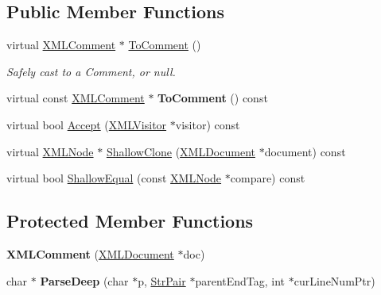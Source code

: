 \subsection*{Public Member Functions}
\begin{DoxyCompactItemize}
\item 
virtual \hyperlink{classtinyxml2_1_1XMLComment}{X\+M\+L\+Comment} $\ast$ \hyperlink{classtinyxml2_1_1XMLComment_a8093e1dc8a34fa446d9dc3fde0e6c0ee}{To\+Comment} ()\hypertarget{classtinyxml2_1_1XMLComment_a8093e1dc8a34fa446d9dc3fde0e6c0ee}{}\label{classtinyxml2_1_1XMLComment_a8093e1dc8a34fa446d9dc3fde0e6c0ee}

\begin{DoxyCompactList}\small\item\em Safely cast to a Comment, or null. \end{DoxyCompactList}\item 
virtual const \hyperlink{classtinyxml2_1_1XMLComment}{X\+M\+L\+Comment} $\ast$ {\bfseries To\+Comment} () const \hypertarget{classtinyxml2_1_1XMLComment_a422aabac22de7d9c9cad130897dd8b1c}{}\label{classtinyxml2_1_1XMLComment_a422aabac22de7d9c9cad130897dd8b1c}

\item 
virtual bool \hyperlink{classtinyxml2_1_1XMLComment_aa382b1be6a8b0650c16a2d88bb499335}{Accept} (\hyperlink{classtinyxml2_1_1XMLVisitor}{X\+M\+L\+Visitor} $\ast$visitor) const 
\item 
virtual \hyperlink{classtinyxml2_1_1XMLNode}{X\+M\+L\+Node} $\ast$ \hyperlink{classtinyxml2_1_1XMLComment_a90bb60193a691b484f5e1b487857016d}{Shallow\+Clone} (\hyperlink{classtinyxml2_1_1XMLDocument}{X\+M\+L\+Document} $\ast$document) const 
\item 
virtual bool \hyperlink{classtinyxml2_1_1XMLComment_a2d9f26757b0018fce933e74420cda22a}{Shallow\+Equal} (const \hyperlink{classtinyxml2_1_1XMLNode}{X\+M\+L\+Node} $\ast$compare) const 
\end{DoxyCompactItemize}
\subsection*{Protected Member Functions}
\begin{DoxyCompactItemize}
\item 
{\bfseries X\+M\+L\+Comment} (\hyperlink{classtinyxml2_1_1XMLDocument}{X\+M\+L\+Document} $\ast$doc)\hypertarget{classtinyxml2_1_1XMLComment_ae6463adc3edd93a8e5a9b2b7e99cdf91}{}\label{classtinyxml2_1_1XMLComment_ae6463adc3edd93a8e5a9b2b7e99cdf91}

\item 
char $\ast$ {\bfseries Parse\+Deep} (char $\ast$p, \hyperlink{classtinyxml2_1_1StrPair}{Str\+Pair} $\ast$parent\+End\+Tag, int $\ast$cur\+Line\+Num\+Ptr)\hypertarget{classtinyxml2_1_1XMLComment_a3430281eed8d1023bafa9e633f44f509}{}\label{classtinyxml2_1_1XMLComment_a3430281eed8d1023bafa9e633f44f509}

\end{DoxyCompactItemize}
